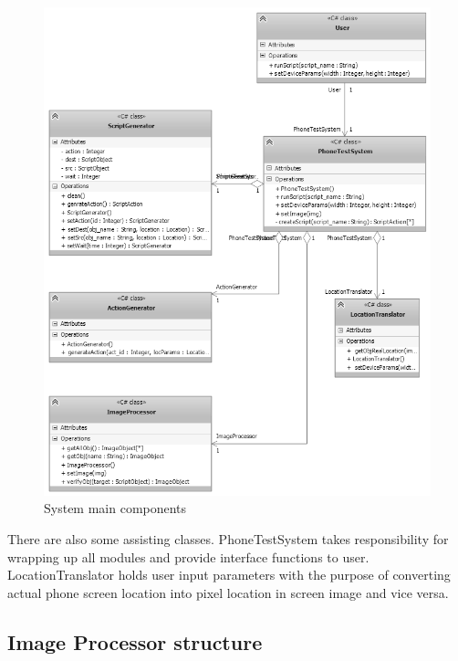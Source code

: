 	\begin{figure}[H]
		\centering
		\includegraphics[scale=0.75]{Chapters/Fig/main_class.png}
		\caption{System main components}
		\label{fig:main_class}
	\end{figure}

There are also some assisting classes. PhoneTestSystem takes responsibility for wrapping up all modules and provide interface functions to user. LocationTranslator holds user input parameters with the purpose of converting actual phone screen location into pixel location in screen image and vice versa.

\subsection{Image Processor structure}

